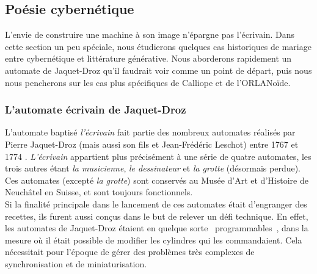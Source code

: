 \documentclass{article}
\begin{document}
		\subsection{Poésie cybernétique}
			L'envie de construire une machine à son image n'épargne pas l'écrivain. Dans cette section un peu spéciale, nous étudierons quelques cas historiques de mariage entre cybernétique et littérature générative. Nous aborderons rapidement un automate de Jaquet-Droz qu'il faudrait voir comme un point de départ, puis nous nous pencherons sur les cas plus spécifiques de Calliope et de l'ORLANoïde.
			
			\subsubsection{L'automate écrivain de Jaquet-Droz}
				L'automate baptisé \textit{l'écrivain} fait partie des nombreux automates réalisés par Pierre Jaquet-Droz (mais aussi son fils et Jean-Frédéric Leschot) entre 1767 et 1774 \autocite{wiki:jaquet_droz}. \textit{L'écrivain} appartient plus précisément à une série de quatre automates, les trois autres étant \textit{la musicienne}, \textit{le dessinateur} et \textit{la grotte} (désormais perdue). Ces automates (excepté \textit{la grotte}) sont conservés au Musée d'Art et d'Histoire de Neuchâtel en Suisse, et sont toujours fonctionnels.\\
				
				Si la finalité principale dans le lancement de ces automates était d'engranger des recettes, ils furent aussi conçus dans le but de relever un défi technique. En effet, les automates de Jaquet-Droz étaient en quelque sorte \guillemotleft~programmables~\guillemotright, dans la mesure où il était possible de modifier les cylindres qui les commandaient. Cela nécessitait pour l'époque de gérer des problèmes très complexes de synchronisation et de miniaturisation.\\
				
\end{document}
